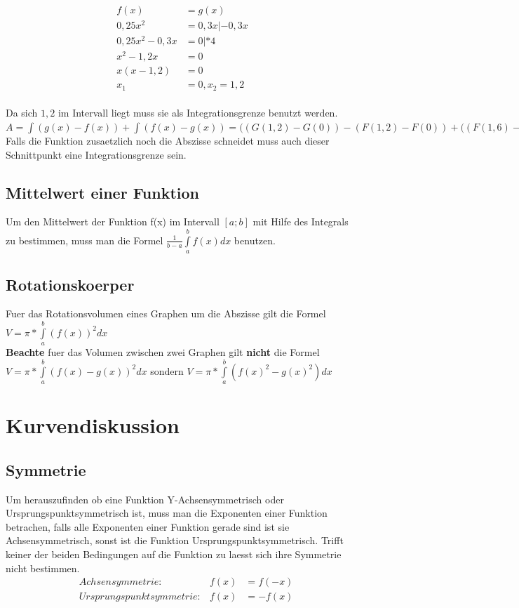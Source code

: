 \documentclass[a4paper]{article} %
\begin{document}
	\begin{align*}
	f(x)&=g(x)\\
	0,25x^2&=0,3x|-0,3x\\
	0,25x^2-0,3x&=0|*4\\
	x^2-1,2x&=0\\
	x(x-1,2)&=0\\
	x_1&=0,x_2=1,2
	\end{align*}
	\\Da sich $1,2$ im Intervall liegt muss sie als Integrationsgrenze benutzt werden.\\
	$A=\int (g(x)-f(x))+\int (f(x)-g(x))=((G(1,2)-G(0))-(F(1,2)-F(0))+((F(1,6)-F(1,2))-(G(1,6)-G(1,2))=$\\
	Falls die Funktion zusaetzlich noch die Abszisse schneidet muss auch dieser Schnittpunkt eine Integrationsgrenze sein.
	\subsection{Mittelwert einer Funktion}
	Um den Mittelwert der Funktion f(x) im Intervall $[a;b]$ mit Hilfe des Integrals zu bestimmen, muss man die Formel
	$\frac{1}{b-a}\int\limits_{a}^{b} f(x)dx$  benutzen.
	\subsection{Rotationskoerper}
	Fuer das Rotationsvolumen eines Graphen um die Abszisse gilt die Formel $V = \pi*\int\limits_{a}^{b}(f(x))^2dx$\\
	\textbf{Beachte} fuer das Volumen zwischen zwei Graphen gilt \textbf{nicht} die Formel $V = \pi*\int\limits_{a}^{b}(f(x)-g(x))^2dx$
	sondern $V = \pi*\int\limits_{a}^{b}(f(x)^2-g(x)^2)dx$
	\section{Kurvendiskussion}
	\subsection{Symmetrie}
	Um herauszufinden ob eine Funktion Y-Achsensymmetrisch oder Ursprungspunktsymmetrisch ist, muss man die Exponenten einer Funktion betrachen, falls alle Exponenten einer Funktion gerade sind ist sie Achsensymmetrisch, sonst ist die Funktion Ursprungspunktsymmetrisch. Trifft keiner der beiden Bedingungen auf die Funktion zu laesst sich ihre Symmetrie nicht bestimmen.
	\begin{align*}
	& Achsensymmetrie:  & f(x)&=f(-x)\\
		& Ursprungspunktsymmetrie:  & f(x)&=-f(x)
	\end{align*}
\end{document}
